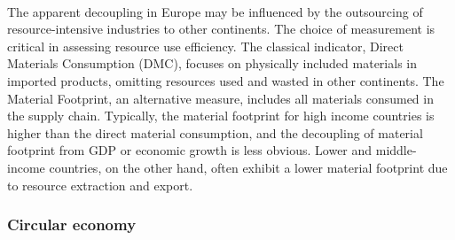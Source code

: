 \documentclass[../summary.tex]{subfiles}
\begin{document}
\\
The apparent decoupling in Europe may be influenced by the outsourcing of resource-intensive industries to other continents. The choice of measurement is critical in assessing resource use efficiency. The classical indicator, Direct Materials Consumption (DMC), focuses on physically included materials in imported products, omitting resources used and wasted in other continents. The Material Footprint, an alternative measure, includes all materials consumed in the supply chain. Typically, the material footprint for high income countries is higher than the direct material consumption, and the decoupling of material footprint from GDP or economic growth is less obvious. Lower and middle-income countries, on the other hand, often exhibit a lower material footprint due to resource extraction and export.
\newpage

\subsubsection{Circular economy}
\end{document}
